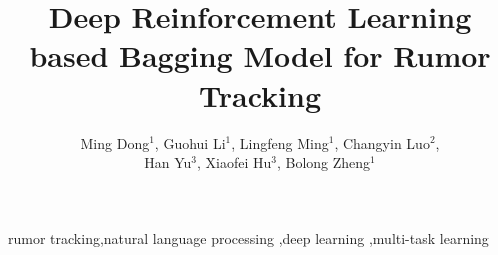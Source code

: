 \documentclass[review]{elsarticle}
\begin{document}
\begin{frontmatter}

\title{Deep Reinforcement Learning based Bagging Model for Rumor Tracking}

\author{Ming Dong$^1$, Guohui Li$^1$, Lingfeng Ming$^1$, Changyin Luo$^2$,\\Han Yu$^3$, Xiaofei Hu$^3$, Bolong Zheng$^1$}
\address{$^1$Huazhong University of Science and Technology, Wuhan, China}
\address{$^2$Central China Normal University, Wuhan, China}
\address{$^3$Wuhan Fiberhome Technical Services Co.,Ltd, Wuhan, China}




\begin{keyword}
rumor tracking\sep natural language processing \sep deep learning \sep multi-task learning
\end{keyword}

\end{frontmatter}

\linenumbers









\end{document}
